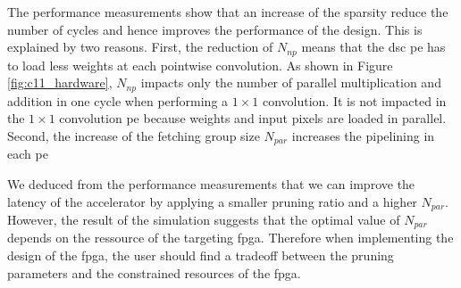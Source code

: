 The performance measurements show that an increase of the sparsity reduce the number of cycles and hence improves the performance of the design. This is explained by two reasons. First, the reduction of $N_{np}$ means that the \acrshort{dsc} \acrshort{pe} has to load less weights at each pointwise convolution.
As shown in Figure \ref{fig:c11_hardware}, $N_{np}$ impacts only the number of parallel multiplication and addition in one cycle when performing a $1 \times 1$ convolution. It is not impacted in the $1 \times 1$ convolution \acrshort{pe} because weights and input pixels are loaded in parallel. Second, the increase of the fetching group size $N_{par}$ increases the pipelining in each \acrshort{pe}

We deduced from the performance measurements that we can improve the latency of the accelerator by applying a smaller pruning ratio and a higher $N_{par}$. However, the result of the simulation suggests that the optimal value of $N_{par}$ depends on the ressource of the targeting \acrshort{fpga}. Therefore when implementing the design of the \acrshort{fpga}, the user should find a tradeoff between the pruning parameters and the constrained resources of the \acrshort{fpga}.

